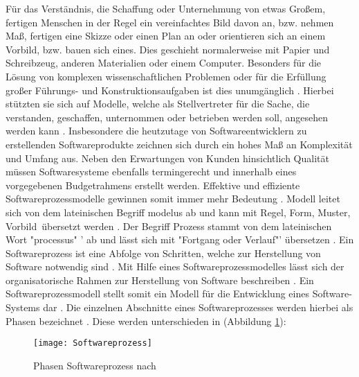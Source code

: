 Für das Verständnis, die Schaffung oder Unternehmung von etwas Großem, fertigen Menschen in der Regel ein vereinfachtes Bild davon an, bzw. nehmen Maß, fertigen eine Skizze oder einen Plan an oder orientieren sich an einem Vorbild, bzw. bauen sich eines. Dies geschieht normalerweise mit Papier und Schreibzeug, anderen Materialien oder einem Computer. Besonders für die Lösung von komplexen wissenschaftlichen Problemen oder für die Erfüllung großer Führungs- und Konstruktionsaufgaben ist dies unumgänglich \cite{Hesse2008}. \newline
Hierbei stützten sie sich auf Modelle, welche als Stellvertreter für die Sache, die verstanden, geschaffen, unternommen oder betrieben werden soll, angesehen werden kann \cite{Hesse2008}. \newline
Insbesondere die heutzutage von Softwareentwicklern zu erstellenden Softwareprodukte zeichnen sich durch ein hohes Maß an Komplexität und Umfang aus. Neben den Erwartungen von Kunden hinsichtlich Qualität müssen Softwaresysteme ebenfalls termingerecht und innerhalb eines vorgegebenen Budgetrahmens erstellt werden. Effektive und effiziente Softwareprozessmodelle gewinnen somit immer mehr Bedeutung \cite{Grechenig2010}.
Modell leitet sich von dem lateinischen Begriff  \glqq modelus \grqq
ab und kann mit  \glqq Regel, Form, Muster, Vorbild\grqq \ übersetzt werden \cite{Hesse2008}. 
Der Begriff Prozess stammt von dem lateinischen Wort "processus" ' ab und lässt sich mit "Fortgang oder Verlauf"' übersetzen \cite{koch2011, Staud2006}. \newline 
Ein Softwareprozess ist eine Abfolge von Schritten, welche zur Herstellung von Software notwendig sind \cite{Mishra2012, Stoerrle2005}. Mit Hilfe eines Softwareprozessmodelles lässt sich der organisatorische Rahmen zur Herstellung von Software beschreiben \cite{Koelmel2000}. Ein Softwareprozessmodell stellt somit ein Modell für die Entwicklung eines Software-Systems dar \cite{Hanser2010}. Die einzelnen Abschnitte eines Softwareprozesses werden hierbei als Phasen bezeichnet \cite{Stoerrle2005}. Diese werden unterschieden in (Abbildung \ref{fig:SEProzess}):

\begin{figure}[htp]
\begin{center}
  \texttt{[image: Softwareprozess]} %
  \caption{Phasen Softwareprozess nach \cite{Hanser2010}}
  \label{fig:SEProzess}
\end{center}
\end{figure}

